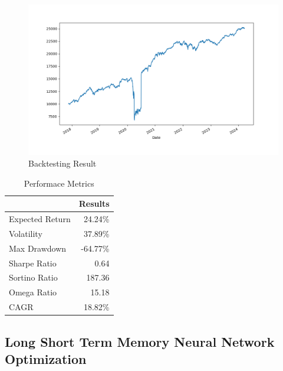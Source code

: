  \begin{figure}[H]
   \centering
   \includegraphics[width=1\linewidth]{images/DMLP/backtest.png}
   \caption{Backtesting Result}
   \label{fig:network_architecture1}
 \end{figure}

 \begin{table}[H]

    \centering %
    \label{tab:performance_metrics}
    
    \caption{Performace Metrics}
    \vspace{5mm} %

\begin{tabular}{lr}
\toprule
 & Results \\
\midrule
Expected Return & 24.24\% \\
Volatility & 37.89\% \\
Max Drawdown & -64.77\% \\
Sharpe Ratio & 0.64 \\
Sortino Ratio & 187.36 \\
Omega Ratio & 15.18 \\
CAGR & 18.82\% \\
\bottomrule
\end{tabular}
\end{table}

\subsection{Long Short Term Memory Neural Network Optimization}


